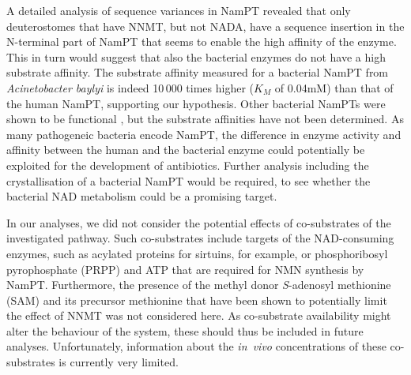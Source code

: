 A detailed analysis of sequence variances in NamPT revealed that only deuterostomes that have NNMT, but not NADA, have a sequence insertion in the N-terminal part of NamPT that seems to enable the high affinity of the enzyme. This in turn would suggest that also the bacterial enzymes do not have a high substrate affinity. The substrate affinity measured for a bacterial NamPT from \textit{Acinetobacter baylyi} \cite{Sorci2010} is indeed 10\,000 times higher  ($K_{M}$ of 0.04mM) than that of the human NamPT, supporting our hypothesis. Other bacterial NamPTs were shown to be functional \cite{Martin2001,Gerdes2006}, but the substrate affinities have not been determined. 
As many pathogeneic bacteria encode NamPT, the difference in enzyme activity and affinity between the human and the bacterial enzyme could potentially be exploited for the development of antibiotics. Further analysis including the crystallisation of a bacterial NamPT would be required, to see whether the bacterial NAD metabolism could be a promising target.


In our analyses, we did not consider the potential effects of co-substrates of the investigated pathway. Such co-substrates include targets of the NAD-consuming enzymes, such as acylated proteins for sirtuins, for example, or phosphoribosyl pyrophosphate (PRPP) and ATP that are required for NMN synthesis by NamPT. Furthermore, the presence of the methyl donor \textit{S}-adenosyl methionine (SAM) and its precursor methionine that have been shown to potentially limit the effect of NNMT \cite{Ulanovskaya2013} was not considered here. As co-substrate availability might alter the behaviour of the system, these should thus be included in future analyses. Unfortunately, information about the \textit{in~vivo} concentrations of these co-substrates is currently very limited.


